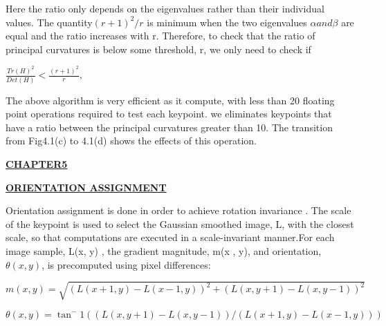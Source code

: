 \documentclass[12pt,a4paper]{report}
\begin{document}
\begin{flushleft}
\vspace{10mm}

Here the ratio only depends on  the eigenvalues rather than their individual values. The quantity$ (r+1)^2/r $ is minimum when the two eigenvalues $\alpha and \beta$  are equal and the ratio  increases with r. Therefore, to check that the ratio of principal curvatures is below some threshold, r, we only need to check if

\vspace{10mm}

\begin{center}$ \frac{Tr(H)^2}{Det(H)} <  \frac{(r+1)^2}{r},$\end{center}

\vspace{10mm}

The above algorithm is very efficient as it compute, with less than 20 floating point operations required to
test each keypoint. we eliminates keypoints that have a ratio between the principal curvatures greater than 10. The transition from Fig4.1(c) to 4.1(d) shows the effects of this operation.

\newpage




\begin{center}\underline{ \Large \textbf{CHAPTER5}}\end{center}
\begin{center}\underline{ \Large \textbf{ORIENTATION ASSIGNMENT}}\end{center}
\vspace{10mm}





Orientation assignment is done in order to  achieve rotation invariance . The scale of the keypoint
is used to select the Gaussian smoothed image, L, with the closest scale, so that  computations are executed in a scale-invariant manner.For each image sample, L(x, y) , the gradient magnitude, m(x , y), and orientation,$ \theta(x , y)$, is precomputed using pixel differences:\par


\vspace{10mm}


$m(x,y) = \sqrt{(L(x+1,y) - L(x-1,y))^2 + (L(x,y+1) - L(x,y-1))^2}$
\vspace{2mm}


$
\theta(x,y) = \tan^-1((L(x,y+1) - L(x,y-1))/(L(x+1,y) - L(x-1,y)))$


\vspace{9mm}



\end{flushleft}
\end{document}
